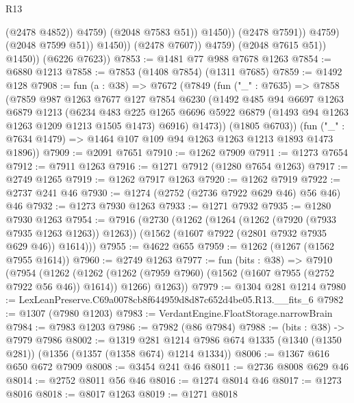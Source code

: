 \begin{lexlean}{R13}
\begin{coremodule}
                                    (@2478 @4852))
                                  @4759)
                                (@2048 @7583 @51))
                              @1450))
                          (@2478 @7591))
                        @4759)
                      (@2048 @7599 @51))
                    @1450))
                (@2478 @7607))
              @4759)
            (@2048 @7615 @51))
          @1450))
      (@6226 @7623))
@7853 := @1481 @77 @988 @7678 @1263
@7854 := @6880 @1213
@7858 := @7853 (@1408 @7854) (@1311 @7685)
@7859 := @1492 @128
@7908 := fun (a : @38) =>
  @7672
    (@7849
      (fun ("_" : @7635) =>
      @7858
        (@7859
          @987
          @1263
          @7677
          @127
          @7854
          @6230
          (@1492
            @485
            @94
            @6697
            @1263
            @6879
            @1213
            (@6234
              @483
              @225
              @1265
              @6696
              @5922
              @6879
              (@1493 @94 @1263 @1263 @1209 @1213 @1505 @1473)
              @6916)
            @1473))
        (@1805 @6703))
      (fun ("_" : @7634 @1479) => @1464 @107 @109 @94 @1263 @1263 @1213 @1893 @1473 @1896))
@7909 := @2091 @7651
@7910 := @1262 @7909
@7911 := @1273 @7654
@7912 := @7911 @1263
@7916 := @1271 @7912 (@1280 @7654 @1263)
@7917 := @2749 @1265
@7919 := @1262 @7917 @1263
@7920 := @1262 @7919
@7922 := @2737 @241 @46
@7930 := @1274 (@2752 (@2736 @7922 @629 @46) @56 @46) @46
@7932 := @1273 @7930 @1263
@7933 := @1271 @7932
@7935 := @1280 @7930 @1263
@7954 := @7916
    (@2730
      (@1262
        (@1264 (@1262 (@7920 (@7933 @7935 @1263 @1263)) @1263))
        (@1562 (@1607 @7922 (@2801 @7932 @7935 @629 @46)) @1614)))
@7955 := @4622 @655
@7959 := @1262 (@1267 (@1562 @7955 @1614))
@7960 := @2749 @1263
@7977 := fun (bits : @38) =>
  @7910
    (@7954
      (@1262
        (@1262 (@1262 (@7959 @7960) (@1562 (@1607 @7955 (@2752 @7922 @56 @46)) @1614)) @1266)
        @1263))
@7979 := @1304 @281 @1214
@7980 := LexLeanPreserve.C69a0078cb8f644959d8d87c652d4be05.R13.__fits_6
@7982 := @1307 (@7980 @1203)
@7983 := VerdantEngine.FloatStorage.narrowBrain
@7984 := @7983 @1203
@7986 := @7982 (@86 @7984)
@7988 := (bits : @38) -> @7979 @7986
@8002 := @1319
    @281
    @1214
    @7986
    @674
    @1335
    (@1340 (@1350 @281))
    (@1356 (@1357 (@1358 @674) @1214 @1334))
@8006 := @1367 @616 @650 @672 @7909
@8008 := @3454 @241 @46
@8011 := @2736 @8008 @629 @46
@8014 := @2752 @8011 @56 @46
@8016 := @1274 @8014 @46
@8017 := @1273 @8016
@8018 := @8017 @1263
@8019 := @1271 @8018

\end{coremodule}
\end{lexlean}
